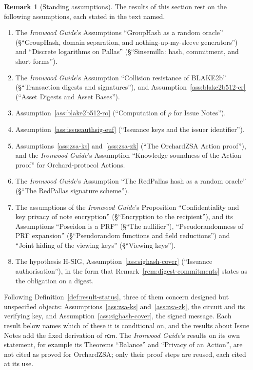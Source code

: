\documentclass[11pt,a4paper]{article}
\theoremstyle{definition}
\newtheorem{remark}[theorem]{Remark}
\newcommand{\rcm}{\ensuremath{\mathsf{rcm}}}
\begin{document}
\begin{remark}[Standing assumptions]
The results of this section rest on the following assumptions, each stated
in the text named.
\begin{enumerate}
\item The \emph{Ironwood Guide}'s Assumptions ``GroupHash as a random
  oracle'' (\S``GroupHash, domain separation, and nothing-up-my-sleeve
  generators'') and ``Discrete logarithms on Pallas'' (\S``Sinsemilla:
  hash, commitment, and short forms'').
\item The \emph{Ironwood Guide}'s Assumption ``Collision resistance of
  BLAKE2b'' (\S``Transaction digests and signatures''), and
  Assumption~\ref{ass:blake2b512-cr} (``Asset Digests and Asset Bases'').
\item Assumption~\ref{ass:blake2b512-ro} (``Computation of $\rho$ for Issue
  Notes'').
\item Assumption~\ref{ass:issueauthsig-euf} (``Issuance keys and the issuer
  identifier'').
\item Assumptions~\ref{ass:zsa-ks} and~\ref{ass:zsa-zk} (``The OrchardZSA
  Action proof''), and the \emph{Ironwood Guide}'s Assumption ``Knowledge
  soundness of the Action proof'' for Orchard-protocol Actions.
\item The \emph{Ironwood Guide}'s Assumption ``The RedPallas hash as a
  random oracle'' (\S``The RedPallas signature scheme'').
\item The assumptions of the \emph{Ironwood Guide}'s Proposition
  ``Confidentiality and key privacy of note encryption'' (\S``Encryption to
  the recipient''), and its Assumptions ``Poseidon is a PRF'' (\S``The
  nullifier''), ``Pseudorandomness of PRF expansion'' (\S``Pseudorandom
  functions and field reductions'') and ``Joint hiding of the viewing keys''
  (\S``Viewing keys'').
\item The hypothesis H-SIG, Assumption~\ref{ass:sighash-cover} (``Issuance
  authorisation''), in the form that Remark~\ref{rem:digest-commitments}
  states as the obligation on a digest.
\end{enumerate}
Following Definition~\ref{def:result-status}, three of them concern designed
but unspecified objects: Assumptions~\ref{ass:zsa-ks} and~\ref{ass:zsa-zk},
the circuit and its verifying key, and Assumption~\ref{ass:sighash-cover},
the signed message. Each result below names which of these it is
conditional on, and the results about Issue Notes add the fixed derivation
of $\rcm$. The \emph{Ironwood Guide}'s results on its own statement, for
example its Theorems ``Balance'' and ``Privacy of an Action'', are not cited
as proved for OrchardZSA; only their proof steps are reused, each cited at
its use.
\end{remark}
\end{document}
